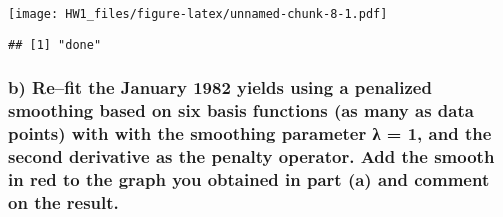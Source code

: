 \documentclass[
]{article}
\newenvironment{Shaded}{\begin{snugshade}}{\end{snugshade}}
\newcommand{\AttributeTok}[1]{\textcolor[rgb]{0.77,0.63,0.00}{#1}}
\newcommand{\ConstantTok}[1]{\textcolor[rgb]{0.00,0.00,0.00}{#1}}
\newcommand{\DecValTok}[1]{\textcolor[rgb]{0.00,0.00,0.81}{#1}}
\newcommand{\FunctionTok}[1]{\textcolor[rgb]{0.00,0.00,0.00}{#1}}
\newcommand{\NormalTok}[1]{#1}
\newcommand{\OtherTok}[1]{\textcolor[rgb]{0.56,0.35,0.01}{#1}}
\newcommand{\SpecialCharTok}[1]{\textcolor[rgb]{0.00,0.00,0.00}{#1}}
\newcommand{\StringTok}[1]{\textcolor[rgb]{0.31,0.60,0.02}{#1}}
\begin{document}
\texttt{[image: HW1\_files/figure-latex/unnamed-chunk-8-1.pdf]}

\begin{verbatim}
## [1] "done"
\end{verbatim}

\hypertarget{b-refit-the-january-1982-yields-using-a-penalized-smoothing-based-on-six-basis-functions-as-many-as-data-points-with-with-the-smoothing-parameter-ux3bb-1-and-the-second-derivative-as-the-penalty-operator.-add-the-smooth-in-red-to-the-graph-you-obtained-in-part-a-and-comment-on-the-result.}{%
\subsubsection{b) Re--fit the January 1982 yields using a penalized
smoothing based on six basis functions (as many as data points) with
with the smoothing parameter λ = 1, and the second derivative as the
penalty operator. Add the smooth in red to the graph you obtained in
part (a) and comment on the
result.}\label{b-refit-the-january-1982-yields-using-a-penalized-smoothing-based-on-six-basis-functions-as-many-as-data-points-with-with-the-smoothing-parameter-ux3bb-1-and-the-second-derivative-as-the-penalty-operator.-add-the-smooth-in-red-to-the-graph-you-obtained-in-part-a-and-comment-on-the-result.}}

\begin{Shaded}
\end{Shaded}
\end{document}
